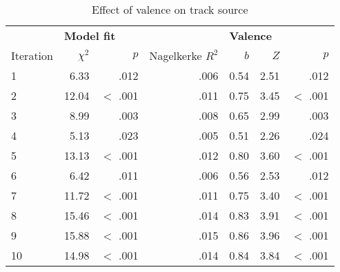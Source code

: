 \begin{table}[h]
\centering
\small

\begin{threeparttable}
\caption{Effect of valence on track source}
\label{tab:val-1}

\begin{tabular*}{\textwidth}{@{\extracolsep{\fill}}lrrrrrr@{}}
\toprule & 
\multicolumn{3}{l}{\textbf{Model fit}} & \multicolumn{3}{l}{\textbf{Valence}} \\ 
\cmidrule{2-7}

Iteration & $\chi^2$ & $p$      & Nagelkerke $R^2$ & $b$       & $Z$       & $p$          \\ 
\midrule

1         & 6.33     & .012     & .006             & 0.54      & 2.51      & .012         \\
2         & 12.04    & $<$ .001 & .011             & 0.75      & 3.45      & $<$ .001     \\
3         & 8.99     & .003     & .008             & 0.65      & 2.99      & .003         \\
4         & 5.13     & .023     & .005             & 0.51      & 2.26      & .024         \\
5         & 13.13    & $<$ .001 & .012             & 0.80      & 3.60      & $<$ .001     \\
6         & 6.42     & .011     & .006             & 0.56      & 2.53      & .012         \\
7         & 11.72    & $<$ .001 & .011             & 0.75      & 3.40      & $<$ .001     \\
8         & 15.46    & $<$ .001 & .014             & 0.83      & 3.91      & $<$ .001     \\
9         & 15.88    & $<$ .001 & .015             & 0.86      & 3.96      & $<$ .001     \\
10        & 14.98    & $<$ .001 & .014             & 0.84      & 3.84      & $<$ .001     \\ 
\bottomrule

\end{tabular*}
\end{threeparttable}
\end{table}